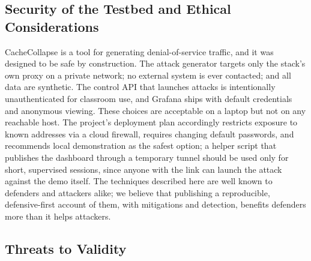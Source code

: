\documentclass[preprint,12pt]{elsarticle}
\begin{document}
\subsection{Security of the Testbed and Ethical Considerations}
\label{sec:ethics}
CacheCollapse is a tool for generating denial-of-service traffic, and it was designed
to be safe by construction. The attack generator targets only the stack's own proxy on
a private network; no external system is ever contacted; and all data are synthetic.
The control API that launches attacks is intentionally unauthenticated for classroom
use, and Grafana ships with default credentials and anonymous viewing. These choices
are acceptable on a laptop but not on any reachable host. The project's deployment
plan accordingly restricts exposure to known addresses via a cloud firewall, requires
changing default passwords, and recommends local demonstration as the safest option;
a helper script that publishes the dashboard through a temporary tunnel should be used
only for short, supervised sessions, since anyone with the link can launch the attack
against the demo itself. The techniques described here are well known to defenders and
attackers alike; we believe that publishing a reproducible, defensive-first account of
them, with mitigations and detection, benefits defenders more than it helps attackers.

\subsection{Threats to Validity}
\label{sec:validity}
\end{document}
